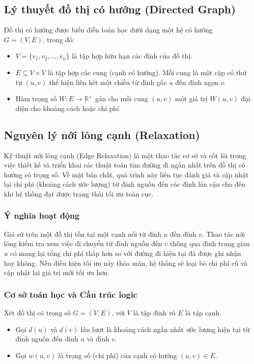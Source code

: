 \documentclass[12pt,a4paper,oneside]{report}
\begin{document}
\subsection{Lý thuyết đồ thị có hướng (Directed Graph)}
Đồ thị có hướng được biểu diễn toán học dưới dạng một hệ có hướng $G = (V, E)$, trong đó:
\begin{itemize}
    \item $V = \{v_1, v_2, ..., v_n\}$ là tập hợp hữu hạn các đỉnh của đồ thị.
    \item $E \subseteq V \times V$ là tập hợp các cung (cạnh có hướng). Mỗi cung là một cặp có thứ tự $(u, v)$ thể hiện liên kết một chiều từ đỉnh gốc $u$ đến đỉnh ngọn $v$.
    \item Hàm trọng số $W: E \to \mathbb{R}^+$ gán cho mỗi cung $(u, v)$ một giá trị $W(u, v)$ đại diện cho khoảng cách hoặc chi phí.
\end{itemize}
\subsection{Nguyên lý nới lỏng cạnh (Relaxation)}
Kỹ thuật nới lỏng cạnh (Edge Relaxation) là một thao tác cơ sở và cốt lõi trong việc thiết kế và triển khai các thuật toán tìm đường đi ngắn nhất trên đồ thị có hướng có trọng số. Về mặt bản chất, quá trình này liên tục đánh giá và cập nhật lại chi phí (khoảng cách ước lượng) từ đỉnh nguồn đến các đỉnh lân cận cho đến khi hệ thống đạt được trạng thái tối ưu toàn cục.

\subsubsection{Ý nghĩa hoạt động}
Giả sử trên một đồ thị tồn tại một cạnh nối từ đỉnh $u$ đến đỉnh $v$. Thao tác nới lỏng kiểm tra xem việc di chuyển từ đỉnh nguồn đến $v$ thông qua đỉnh trung gian $u$ có mang lại tổng chi phí thấp hơn so với đường đi hiện tại đã được ghi nhận hay không. Nếu điều kiện tối ưu này thỏa mãn, hệ thống sẽ loại bỏ chi phí cũ và cập nhật lại giá trị mới tối ưu hơn.

\subsubsection{Cơ sở toán học và Cấu trúc logic}
Xét đồ thị có trọng số $G = (V, E)$, với $V$ là tập đỉnh và $E$ là tập cạnh.
\begin{itemize}
    \item Gọi $d(u)$ và $d(v)$ lần lượt là khoảng cách ngắn nhất ước lượng hiện tại từ đỉnh nguồn đến đỉnh $u$ và đỉnh $v$.
    \item Gọi $w(u, v)$ là trọng số (chi phí) của cạnh có hướng $(u, v) \in E$.
\end{itemize}
\end{document}

